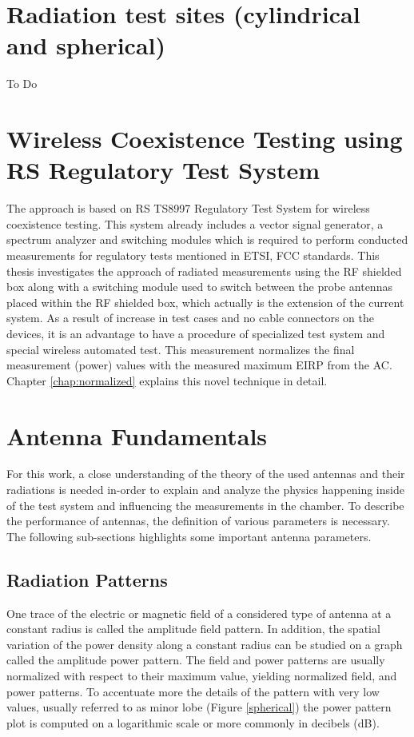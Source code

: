  

\section{Radiation test sites (cylindrical and spherical)}

To Do




\section{Wireless Coexistence Testing using \acs{RS}\textregistered{} Regulatory Test System}
The approach is based on \acs{RS}\textregistered{} TS8997 Regulatory Test System for wireless coexistence testing. This system already includes a vector signal generator, a spectrum analyzer and switching modules which is required to perform conducted measurements for regulatory tests mentioned in \acs{ETSI}, \acs{FCC} standards. This thesis investigates the approach of radiated measurements using the \acs{RF} shielded box along with a switching module used to switch between the probe antennas placed within the \acs{RF} shielded box, which actually is the extension of the current system. As a result of increase in test cases and no cable connectors on the devices, it is an advantage to have a procedure of specialized test system and special wireless automated test. This measurement normalizes the final measurement (power) values with the measured maximum \acs{EIRP} from the \acs{AC}. Chapter \ref{chap:normalized} explains this novel technique in detail.

\section{Antenna Fundamentals}
For this work, a close understanding of the theory of the used antennas and their radiations is needed in-order to explain and analyze the physics happening inside of the test system and influencing the measurements in the chamber. To describe the performance of antennas, the definition of various parameters is necessary. The following sub-sections highlights some important antenna parameters.

\subsection{Radiation Patterns}
One trace of the electric or magnetic field of a considered type of antenna at a constant radius is called the amplitude field pattern. In addition, the spatial variation of the power density along a constant radius can be studied on a graph called the amplitude power pattern. The field and power patterns are usually normalized with respect to their maximum value, yielding normalized field, and power patterns. To accentuate more the details of the pattern with very low values, usually referred to as minor lobe (Figure \ref{spherical}) the power pattern plot is computed on a logarithmic scale or more commonly in decibels (dB). \\


